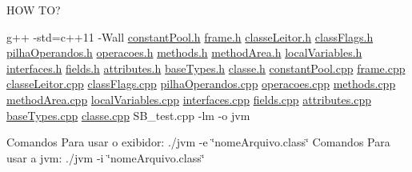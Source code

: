 H\+OW TO?

g++ -\/std=c++11 -\/Wall \mbox{\hyperlink{constantPool_8h}{constant\+Pool.\+h}} \mbox{\hyperlink{frame_8h}{frame.\+h}} \mbox{\hyperlink{classeLeitor_8h}{classe\+Leitor.\+h}} \mbox{\hyperlink{classFlags_8h}{class\+Flags.\+h}} \mbox{\hyperlink{pilhaOperandos_8h}{pilha\+Operandos.\+h}} \mbox{\hyperlink{operacoes_8h}{operacoes.\+h}} \mbox{\hyperlink{methods_8h_source}{methods.\+h}} \mbox{\hyperlink{methodArea_8h}{method\+Area.\+h}} \mbox{\hyperlink{localVariables_8h}{local\+Variables.\+h}} \mbox{\hyperlink{interfaces_8h}{interfaces.\+h}} \mbox{\hyperlink{fields_8h}{fields.\+h}} \mbox{\hyperlink{attributes_8h}{attributes.\+h}} \mbox{\hyperlink{baseTypes_8h}{base\+Types.\+h}} \mbox{\hyperlink{classe_8h}{classe.\+h}} \mbox{\hyperlink{constantPool_8cpp}{constant\+Pool.\+cpp}} \mbox{\hyperlink{frame_8cpp}{frame.\+cpp}} \mbox{\hyperlink{classeLeitor_8cpp}{classe\+Leitor.\+cpp}} \mbox{\hyperlink{classFlags_8cpp}{class\+Flags.\+cpp}} \mbox{\hyperlink{pilhaOperandos_8cpp}{pilha\+Operandos.\+cpp}} \mbox{\hyperlink{operacoes_8cpp}{operacoes.\+cpp}} \mbox{\hyperlink{methods_8cpp}{methods.\+cpp}} \mbox{\hyperlink{methodArea_8cpp}{method\+Area.\+cpp}} \mbox{\hyperlink{localVariables_8cpp}{local\+Variables.\+cpp}} \mbox{\hyperlink{interfaces_8cpp}{interfaces.\+cpp}} \mbox{\hyperlink{fields_8cpp}{fields.\+cpp}} \mbox{\hyperlink{attributes_8cpp}{attributes.\+cpp}} \mbox{\hyperlink{baseTypes_8cpp}{base\+Types.\+cpp}} \mbox{\hyperlink{classe_8cpp}{classe.\+cpp}} S\+B\+\_\+test.\+cpp -\/lm -\/o jvm

Comandos Para usar o exibidor\+: ./jvm -\/e \char`\"{}nome\+Arquivo.\+class\char`\"{} Comandos Para usar a jvm\+: ./jvm -\/i \char`\"{}nome\+Arquivo.\+class\char`\"{} 